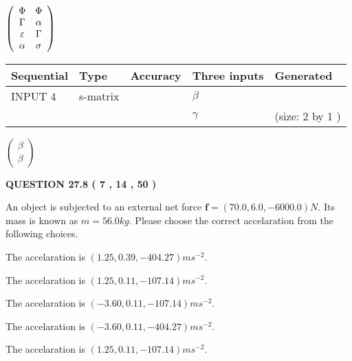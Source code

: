 \documentclass[12pt]{article}
\begin{document}
   
 $  \left( \begin{array}
 {
 c
 c
 }
 \Phi & 
 \Phi \\ 
 \Gamma & 
 \alpha \\ 
 \varepsilon & 
 \Gamma \\ 
 \alpha & 
 \sigma
 \end{array} \right) $ 
  
  
\noindent\begin{tabular}{|l|l|l|l|l|}
\hline
 Sequential & Type & Accuracy & Three inputs & Generated \\ 
\hline
 
 
  INPUT $            4 $ & s-matrix & & 
 $  \beta $ & 
  \\
  & & & 
 $  \gamma $ & 
  (size:            2  by            1 )
 \\  \hline  
 \end{tabular}
   
   
 $  \left( \begin{array}
 {
 c
 }
 \beta \\ 
 \beta
 \end{array} \right) $ 
  
\vspace{0.2in}
  
{\textbf{\Large{QUESTION
27.8 
 (           7 ,          14 ,          50 )
}}}
  
  
 
An object is subjected to an external net force $\mathbf{f}=
(70.0 , 6.0 , -6000.0) N$.
Its mass is known as $m= %
56.0 kg$.
Please choose the correct accelaration from the following choices.
 
 
  The accelaration is $  %
(
1.25,
0.39,
-404.27)
ms^{-2} $.
 
 
  The accelaration is $  %
(
1.25,
0.11,
-107.14)
ms^{-2} $.
 
 
  The accelaration is $  %
(
-3.60,
0.11,
-107.14)
ms^{-2} $.
 
 
  The accelaration is $  %
(
-3.60,
0.11,
-404.27)
ms^{-2} $.
 
 
\noindent{}
 
 
  The accelaration is $  %
(
1.25,
0.11,
-107.14)
ms^{-2} $.
 
 
\noindent{}
 
\end{document}
